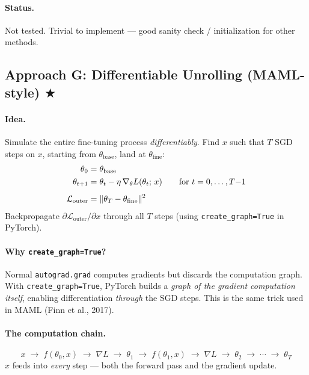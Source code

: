 \documentclass[11pt,a4paper]{article}
\begin{document}
\paragraph{Status.} \colorbox{yellow!30}{Not tested.} Trivial to implement — good sanity check / initialization for other methods.

\subsection{Approach G: Differentiable Unrolling (MAML-style) \texorpdfstring{$\bigstar$}{*}}

\paragraph{Idea.} Simulate the entire fine-tuning process \emph{differentiably}. Find $x$ such that $T$ SGD steps on $x$, starting from $\theta_{\mathrm{base}}$, land at $\theta_{\mathrm{fine}}$:
\begin{align}
  \theta_0 &= \theta_{\mathrm{base}} \notag\\
  \theta_{t+1} &= \theta_t - \eta\,\nabla_\theta L(\theta_t;\, x) \qquad \text{for } t = 0,\dots,T{-}1 \label{eq:inner}\\[4pt]
  \mathcal{L}_{\mathrm{outer}} &= \|\theta_T - \theta_{\mathrm{fine}}\|^2 \notag
\end{align}
Backpropagate $\partial\mathcal{L}_{\mathrm{outer}}/\partial x$ through all $T$ steps (using \texttt{create\_graph=True} in PyTorch).

\paragraph{Why \texttt{create\_graph=True}?}
Normal \texttt{autograd.grad} computes gradients but discards the computation graph. With \texttt{create\_graph=True}, PyTorch builds a \emph{graph of the gradient computation itself}, enabling differentiation \emph{through} the SGD steps. This is the same trick used in MAML (Finn et al., 2017).

\paragraph{The computation chain.}
\[
  x \;\longrightarrow\; f(\theta_0, x) \;\longrightarrow\; \nabla L \;\longrightarrow\; \theta_1 \;\longrightarrow\; f(\theta_1, x) \;\longrightarrow\; \nabla L \;\longrightarrow\; \theta_2 \;\longrightarrow\; \cdots \;\longrightarrow\; \theta_T
\]
$x$ feeds into \emph{every} step — both the forward pass and the gradient update.
\end{document}
